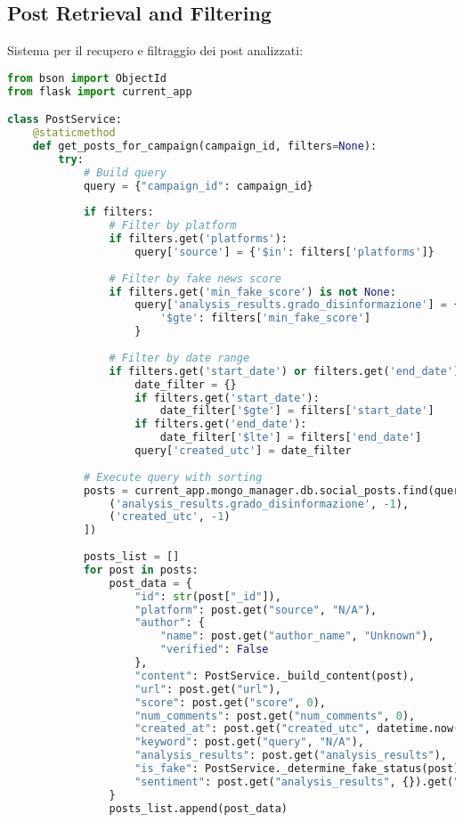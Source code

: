 \documentclass[12pt,a4paper]{report}
\begin{document}
\subsection{Post Retrieval and Filtering}

Sistema per il recupero e filtraggio dei post analizzati:

\begin{lstlisting}[language=Python, caption=Post Service]
from bson import ObjectId
from flask import current_app

class PostService:
    @staticmethod
    def get_posts_for_campaign(campaign_id, filters=None):
        try:
            # Build query
            query = {"campaign_id": campaign_id}
            
            if filters:
                # Filter by platform
                if filters.get('platforms'):
                    query['source'] = {'$in': filters['platforms']}
                
                # Filter by fake news score
                if filters.get('min_fake_score') is not None:
                    query['analysis_results.grado_disinformazione'] = {
                        '$gte': filters['min_fake_score']
                    }
                
                # Filter by date range
                if filters.get('start_date') or filters.get('end_date'):
                    date_filter = {}
                    if filters.get('start_date'):
                        date_filter['$gte'] = filters['start_date']
                    if filters.get('end_date'):
                        date_filter['$lte'] = filters['end_date']
                    query['created_utc'] = date_filter
            
            # Execute query with sorting
            posts = current_app.mongo_manager.db.social_posts.find(query).sort([
                ('analysis_results.grado_disinformazione', -1),
                ('created_utc', -1)
            ])
            
            posts_list = []
            for post in posts:
                post_data = {
                    "id": str(post["_id"]),
                    "platform": post.get("source", "N/A"),
                    "author": {
                        "name": post.get("author_name", "Unknown"),
                        "verified": False
                    },
                    "content": PostService._build_content(post),
                    "url": post.get("url"),
                    "score": post.get("score", 0),
                    "num_comments": post.get("num_comments", 0),
                    "created_at": post.get("created_utc", datetime.now()).isoformat(),
                    "keyword": post.get("query", "N/A"),
                    "analysis_results": post.get("analysis_results"),
                    "is_fake": PostService._determine_fake_status(post),
                    "sentiment": post.get("analysis_results", {}).get("sentiment", "neutral")
                }
                posts_list.append(post_data)
            

\end{lstlisting}
\end{document}
